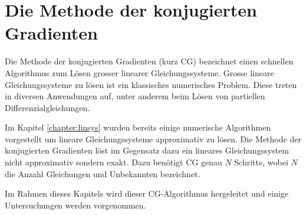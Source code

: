 %
%
%
\chapter{Die Methode der konjugierten Gradienten\label{chapter:cg}}
\begin{refsection}
%
%

{\parindent0pt
Die} Methode der konjugierten Gradienten (kurz CG) bezeichnet einen schnellen Algorithmus zum Lösen grosser linearer Gleichungssysteme.
Grosse lineare Gleichungssysteme zu lösen ist ein klassisches numerisches Problem.
Diese treten in diversen Anwendungen auf, unter anderem beim Lösen von partiellen Differenzialgleichungen.

Im Kapitel \ref{chapter:linsys} wurden bereits einige numerische Algorithmen vorgestellt um lineare Gleichungssysteme approximativ zu lösen.
Die Methode der konjugierten Gradienten löst im Gegensatz dazu ein lineares Gleichungssystem nicht approximativ sondern exakt.
Dazu benötigt CG genau $N$ Schritte, wobei $N$ die Anzahl Gleichungen und Unbekannten bezeichnet.

Im Rahmen dieses Kapitels wird dieser CG-Algorithmus hergeleitet und einige Untersuchungen werden vorgenommen.
%







\printbibliography[heading=subbibliography]
\end{refsection}
